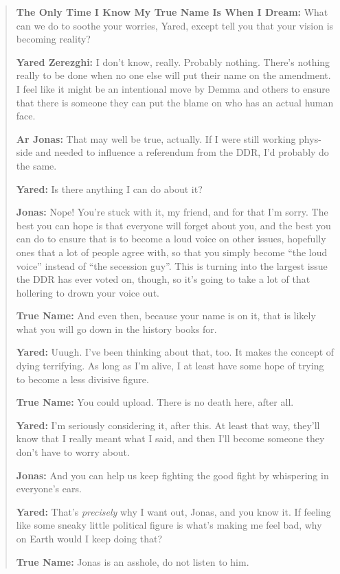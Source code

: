 \begin{quote}
\textbf{The Only Time I Know My True Name Is When I Dream:} What can we do to soothe your worries, Yared, except tell you that your vision is becoming reality?

\textbf{Yared Zerezghi:} I don't know, really. Probably nothing. There's nothing really to be done when no one else will put their name on the amendment. I feel like it might be an intentional move by Demma and others to ensure that there is someone they can put the blame on who has an actual human face.

\textbf{Ar Jonas:} That may well be true, actually. If I were still working phys-side and needed to influence a referendum from the DDR, I'd probably do the same.

\textbf{Yared:} Is there anything I can do about it?

\textbf{Jonas:} Nope! You're stuck with it, my friend, and for that I'm sorry. The best you can hope is that everyone will forget about you, and the best you can do to ensure that is to become a loud voice on other issues, hopefully ones that a lot of people agree with, so that you simply become ``the loud voice'' instead of ``the secession guy''. This is turning into the largest issue the DDR has ever voted on, though, so it's going to take a lot of that hollering to drown your voice out.

\textbf{True Name:} And even then, because your name is on it, that is likely what you will go down in the history books for.

\textbf{Yared:} Uuugh. I've been thinking about that, too. It makes the concept of dying terrifying. As long as I'm alive, I at least have some hope of trying to become a less divisive figure.

\textbf{True Name:} You could upload. There is no death here, after all.

\textbf{Yared:} I'm seriously considering it, after this. At least that way, they'll know that I really meant what I said, and then I'll become someone they don't have to worry about.

\textbf{Jonas:} And you can help us keep fighting the good fight by whispering in everyone's ears.

\textbf{Yared:} That's \emph{precisely} why I want out, Jonas, and you know it. If feeling like some sneaky little political figure is what's making me feel bad, why on Earth would I keep doing that?

\textbf{True Name:} Jonas is an asshole, do not listen to him.


\end{quote}

